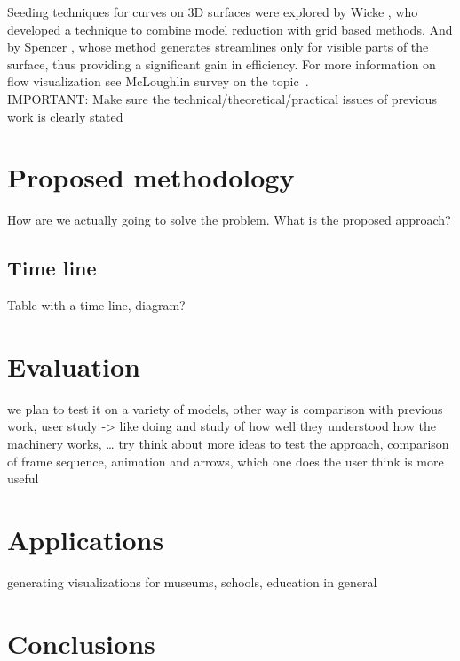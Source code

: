 \documentclass[11pt]{report}
\begin{document}
Seeding techniques for curves on 3D surfaces were explored by Wicke \cite{Wicke2009}, who developed a technique to combine model reduction with grid based methods.
And by Spencer \cite{Spencer2009}, whose method generates streamlines only for visible parts of the surface, thus providing a significant gain in efficiency.
For more information on flow visualization see McLoughlin survey on the topic~\cite{McLoughlin2010}.\\


IMPORTANT: Make sure the technical/theoretical/practical issues of previous work is clearly stated 

\chapter{Proposed methodology}

How are we actually going to solve the problem.
What is the proposed approach?

\section{Time line}

Table with a time line, diagram?

\chapter{Evaluation}

we plan to test it on a variety of models, other way is comparison with previous work, user study -> like doing and study of how well they understood how the machinery works, … try think about more ideas to test the approach, comparison of frame sequence, animation and arrows, which one does the user think is more useful 

\chapter{Applications}

generating visualizations for museums, schools, education in general

\chapter{Conclusions}






\end{document}
